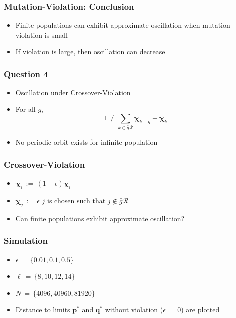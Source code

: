 \documentclass[aspectratio=169]{beamer}
\begin{document}
  
  \begin{frame}
    \frametitle{Mutation-Violation: Conclusion}
    \begin{itemize}      
      \setlength\itemsep{1em}
      \item{Finite populations can exhibit approximate oscillation when mutation-violation is small}
      \item{If violation is large, then oscillation can decrease}      
    \end{itemize}
  \end{frame}
  
   \begin{frame}
    \frametitle{Question 4}
    \begin{itemize}
      \item{Oscillation under Crossover-Violation}      
      \item For all $g$,
      \[	
	1 \neq \sum \limits_{k \in \bar{g}\mathcal{R}} \bm{\chi}_{k+g} + \bm{\chi}_k 
      \]
      \item{No periodic orbit exists for infinite population}
      
    \end{itemize}
  \end{frame}
  
  \begin{frame}
    \frametitle{Crossover-Violation}
    \begin{itemize}
      \setlength\itemsep{1em}
      \item{$\bm{\chi}_i \,:=\, (1 - \epsilon) \bm{\chi}_i$}
      \item{$\bm{\chi}_j \,:=\, \epsilon$  \hspace{1cm}  $j$ is chosen such that $j \not\in \bar{g}\mathcal{R}$}
      \item{Can finite populations exhibit approximate oscillation?}
    \end{itemize}
  \end{frame}
  
  \begin{frame}
    \frametitle{Simulation}
    \begin{itemize}
      \setlength\itemsep{1em}
      \item{$\epsilon \,=\, \{0.01, 0.1, 0.5\}$}      
      \item{$\ell \,=\, \{8,10,12,14\}$}
      \item{$N \,=\, \{4096, 40960, 81920\}$}
      \item{Distance to limits $\bm{p}^\ast$ and $\bm{q}^\ast$ without violation ($\epsilon \,=\, 0$) are plotted }
    \end{itemize}
  \end{frame}
  
\end{document}
